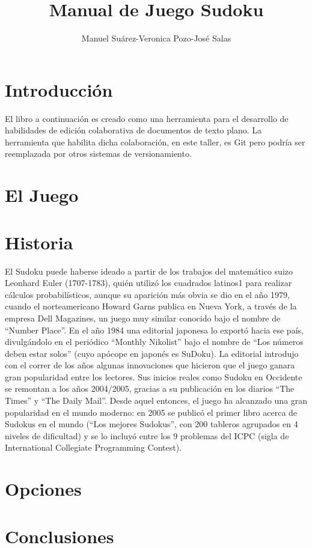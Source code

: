 \documentclass[12pt,oneside]{book}
\title{Manual de Juego Sudoku}
\author{Manuel Suárez-Veronica Pozo-José Salas}
\begin{document}
\maketitle
\tableofcontents

\chapter{Introducción}
El libro a continuación es creado como una herramienta para el desarrollo de habilidades de edición colaborativa de documentos de texto plano. La herramienta que habilita dicha colaboración, en este taller, es Git pero podría ser reemplazada por otros sistemas de versionamiento.

\chapter{El Juego}
\chapter{Historia}
El Sudoku puede haberse ideado a partir de los trabajos del matemático suizo Leonhard Euler (1707-1783), quién utilizó los cuadrados latinos1 para realizar cálculos probabilísticos, aunque su aparición más obvia se dio en el año 1979, cuando el norteamericano Howard Garns publica en Nueva York, a través de la empresa Dell Magazines, un juego muy similar conocido bajo el nombre de “Number Place”. En el año 1984 una editorial japonesa lo exportó hacia ese país, divulgándolo en el periódico “Monthly Nikolist” bajo el nombre de “Los números deben estar solos” (cuyo apócope en japonés es SuDoku). La editorial introdujo con el correr de los años algunas innovaciones que hicieron que el juego ganara gran popularidad entre los lectores. 
Sus inicios reales como Sudoku en Occidente se remontan a los años 2004/2005, gracias a su publicación en los diarios “The Times” y “The Daily Mail”. Desde aquel entonces, el juego ha alcanzado una gran popularidad en el mundo moderno: en 2005 se publicó el primer libro acerca de Sudokus en el mundo (“Los mejores Sudokus”, con 200 tableros agrupados en 4 niveles de dificultad) y se lo incluyó entre los 9 problemas del ICPC (sigla de International Collegiate Programming Contest). 
\chapter{Opciones}

\chapter{Conclusiones}
\end{document}

